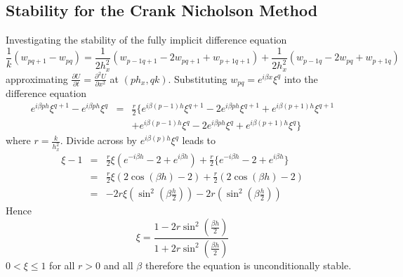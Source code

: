 \subsection{Stability for the Crank Nicholson Method}
Investigating the stability of the fully implicit difference equation
\[\frac{1}{k}(w_{pq+1}-w_{pq})=\frac{1}{2h_x^2}(w_{p-1q+1}-2w_{pq+1}+w_{p+1q+1})+\frac{1}{2h_x^2}(w_{p-1q}-2w_{pq}+w_{p+1q})\]
approximating $\frac{\partial U}{\partial t}=\frac{\partial^2 U}{\partial x^2}$ at $(ph_x,qk)$. Substituting $w_{pq}=e^{i\beta x}\xi^{q}$ into the difference equation
\begin{eqnarray*}e^{i\beta ph}\xi^{q+1}-e^{i\beta ph}\xi^{q}&=&
\frac{r}{2} \{
e^{i\beta (p-1)h}\xi^{q+1}
-2e^{i\beta ph}\xi^{q+1}
+
e^{i\beta (p+1)h}\xi^{q+1}\\
 & & +
e^{i\beta (p-1)h}\xi^{q}
-2e^{i\beta ph}\xi^{q}
+
e^{i\beta (p+1)h}\xi^{q}
 \}
\end{eqnarray*}
where $r=\frac{k}{h_x^2}$. Divide across by $e^{i\beta (p)h}\xi^{q}$ leads to
\begin{eqnarray*} \xi-1&=&\frac{r}{2}\xi(e^{-i\beta h}
-2
+
e^{i\beta h})+\frac{r}{2}\{
e^{-i\beta h}
-2
+
e^{i\beta h}
 \}\\
&=& \frac{r}{2} \xi(2\cos(\beta h)-2)+\frac{r}{2} (2\cos(\beta h)-2)\\
&=&-2r\xi(\sin^2(\beta\frac{h}{2}))-2r(\sin^2(\beta\frac{h}{2}))
\end{eqnarray*}
Hence \[\xi = \frac{1-2r\sin^2(\frac{\beta h}{2})}{1+2r\sin^2(\frac{\beta h}{2})}\]
$0 < \xi \leq 1$ for all $r>0$ and all $\beta$ therefore the equation is unconditionally stable.

